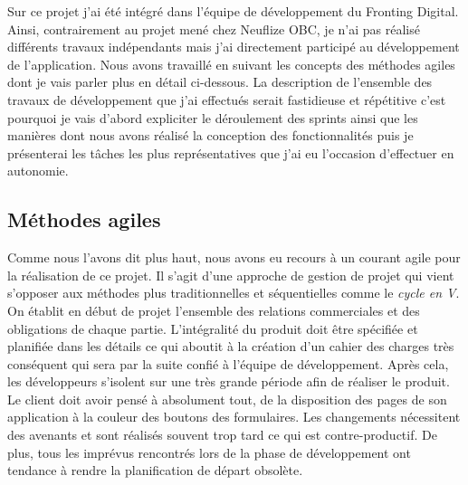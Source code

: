 	Sur ce projet j'ai été intégré dans l'équipe de développement du Fronting Digital. Ainsi, contrairement au projet mené chez Neuflize OBC, je n'ai pas réalisé différents travaux indépendants mais j'ai directement participé au développement de l'application. Nous avons travaillé en suivant les concepts des méthodes agiles \cite{bib_agile} dont je vais parler plus en détail ci-dessous. La description de l'ensemble des travaux de développement que j'ai effectués serait fastidieuse et répétitive c'est pourquoi je vais d'abord expliciter le déroulement des sprints ainsi que les manières dont nous avons réalisé la conception des fonctionnalités puis je présenterai les tâches les plus représentatives que j'ai eu l'occasion d'effectuer en autonomie.

\subsection{Méthodes agiles}
	Comme nous l'avons dit plus haut, nous avons eu recours à un courant agile \cite{bib_agile2} pour la réalisation de ce projet. Il s'agit d'une approche de gestion de projet qui vient s'opposer aux méthodes plus traditionnelles et séquentielles comme le \textit{cycle en V}. On établit en début de projet l'ensemble des relations commerciales et des obligations de chaque partie. L'intégralité du produit doit être spécifiée et planifiée dans les détails ce qui aboutit à la création d'un cahier des charges très conséquent qui sera par la suite confié à l'équipe de développement. Après cela, les développeurs s'isolent sur une très grande période afin de réaliser le produit. Le client doit avoir pensé à absolument tout, de la disposition des pages de son application à la couleur des boutons des formulaires. Les changements nécessitent des avenants et sont réalisés souvent trop tard ce qui est contre-productif. De plus, tous les imprévus rencontrés lors de la phase de développement ont tendance à rendre la planification de départ obsolète. \\
	

